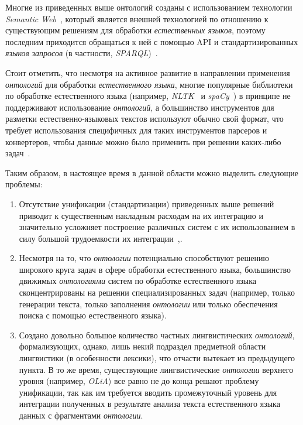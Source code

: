 Многие из приведенных выше онтологий созданы с использованием технологии \textit{Semantic Web}~\cite{sem_web}, который является внешней технологией по отношению к существующим решениям для обработки \textit{естественных языков}, поэтому последним приходится обращаться к ней с помощью API и стандартизированных \textit{языков запросов} (в частности, \textit{SPARQL})~\cite{Bouayad_2014}.

Стоит отметить, что несмотря на активное развитие в направлении применения \textit{онтологий} для обработки \textit{естественного языка}, многие популярные библиотеки по обработке естественного языка (например, \textit{NLTK}~\cite{nltk} и \textit{spaCy}~\cite{spacy}) в принципе не поддерживают использование \textit{онтологий}, а большинство инструментов для разметки естественно-языковых текстов используют обычно свой формат, что требует использования специфичных для таких инструментов парсеров и конвертеров, чтобы данные можно было применить при решении каких-либо задач~\cite[p.~3]{Erekhinskaya2020TenWO}.

Таким образом, в настоящее время в данной области можно выделить следующие проблемы:
\begin{enumerate}
    \item Отсутствие унификации (стандартизации) приведенных выше решений приводит к существенным накладным расходам на их интеграцию и значительно усложняет построение различных систем с их использованием в силу большой трудоемкости их интеграции~\cite{Standard2021},\cite{Golenkov2021}.
    \item Несмотря на то, что \textit{онтологии} потенциально способствуют решению широкого круга задач в сфере обработки естественного языка, большинство движимых \textit{онтологиями} систем по обработке естественного языка сконцентрированы на решении специализированных задач (например, только генерации текста, только заполнения \textit{онтологии} или только обеспечения поиска с помощью естественного языка).
    \item Создано довольно большое количество частных лингвистических \textit{онтологий}, формализующих, однако, лишь некий подраздел предметной области лингвистики (в особенности лексики), что отчасти вытекает из предыдущего пункта.
    В то же время, существующие лингвистические \textit{онтологии} верхнего уровня (например, \textit{OLiA}) все равно не до конца решают проблему унификации, так как им требуется вводить промежуточный уровень для интеграции полученных в результате анализа текста естественного языка данных с фрагментами \textit{онтологии}.
\end{enumerate}

